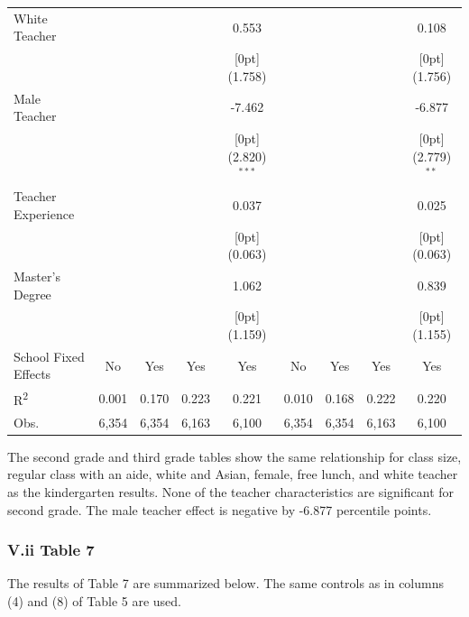 \documentclass[a4paper,11pt]{article}
\begin{document}
\begin{table}[H]
\begin{tabular*}{\textwidth}{@{\extracolsep{\fill}}lcccccccc}
	White Teacher &	&	&	&	0.553 &	&	&	&	0.108\\
	&	&	&	&	\raisebox{.7ex}[0pt]{\scriptsize (1.758)} &	&	&	&	\raisebox{.7ex}[0pt]{\scriptsize (1.756)}\\
	Male Teacher &	&	&	&	-7.462  &	&	&	&	-6.877\\
	&	&	&	&	\raisebox{.7ex}[0pt]{\scriptsize (2.820)$^{***}$} 	&	&	&	&	\raisebox{.7ex}[0pt]{\scriptsize (2.779)$^{**}$} \\
	Teacher Experience &	&	&	&	0.037 &	&	&	&	0.025 \\
	&	&	&	&	\raisebox{.7ex}[0pt]{\scriptsize (0.063)} &	&	&	&	\raisebox{.7ex}[0pt]{\scriptsize (0.063)}\\
	Master's Degree &	&	&	&	1.062 &	&	&	&	0.839\\
	&	&	&	&	\raisebox{.7ex}[0pt]{\scriptsize (1.159)} &	&	&	&	\raisebox{.7ex}[0pt]{\scriptsize (1.155)}\\
	School Fixed Effects &	No  & Yes &	Yes & Yes &	No & Yes &	Yes & Yes \\
	R\textsuperscript{2} & 0.001 & 0.170 & 0.223 & 0.221 & 0.010 & 0.168 & 0.222 & 0.220  \\
	Obs. &	6,354 &	6,354 &	6,163 &	6,100 &	6,354 &	6,354 &	6,163 &	6,100 \\
	\hline\hline				
\end{tabular*}
\end{table}
The second grade and third grade tables show the same relationship for class size, regular class with an aide, white and Asian, female, free lunch, and white teacher as the kindergarten results. None of the teacher characteristics are significant for second grade. The male teacher effect is negative by -6.877 percentile points.  \\


\subsubsection*{V.ii Table 7}
The results of Table 7 are summarized below. The same controls as in columns (4) and (8) of Table 5 are used. \par
\end{document}
